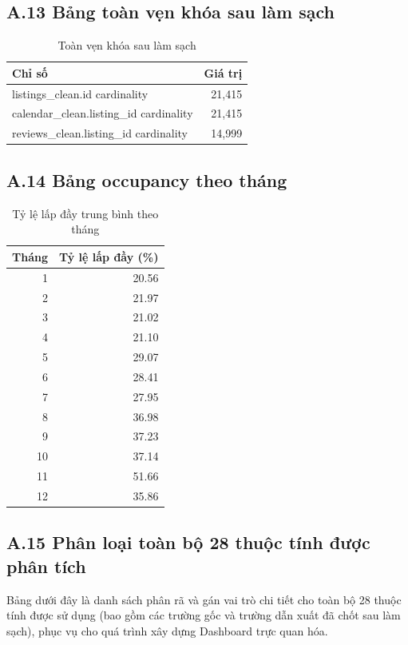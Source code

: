 \subsection*{A.13 Bảng toàn vẹn khóa sau làm sạch}

\begin{table}[H]
\centering
\caption{Toàn vẹn khóa sau làm sạch}\label{tab:A13}
\begin{tabular}{|l|r|}
\hline
\textbf{Chỉ số} & \textbf{Giá trị} \\
\hline
listings\_clean.id cardinality          & 21,415 \\
calendar\_clean.listing\_id cardinality & 21,415 \\
reviews\_clean.listing\_id cardinality  & 14,999 \\
\hline
\end{tabular}
\end{table}

\subsection*{A.14 Bảng occupancy theo tháng}

\begin{table}[H]
\centering
\caption{Tỷ lệ lấp đầy trung bình theo tháng}\label{tab:A14}
\begin{tabular}{|r|r|}
\hline
\textbf{Tháng} & \textbf{Tỷ lệ lấp đầy (\%)} \\
\hline
1  & 20.56 \\
2  & 21.97 \\
3  & 21.02 \\
4  & 21.10 \\
5  & 29.07 \\
6  & 28.41 \\
7  & 27.95 \\
8  & 36.98 \\
9  & 37.23 \\
10 & 37.14 \\
11 & 51.66 \\
12 & 35.86 \\
\hline
\end{tabular}
\end{table}

\subsection*{A.15 Phân loại toàn bộ 28 thuộc tính được phân tích}

Bảng dưới đây là danh sách phân rã và gán vai trò chi tiết cho toàn bộ 28 thuộc tính được sử dụng (bao gồm các trường gốc và trường dẫn xuất đã chốt sau làm sạch), phục vụ cho quá trình xây dựng Dashboard trực quan hóa.


